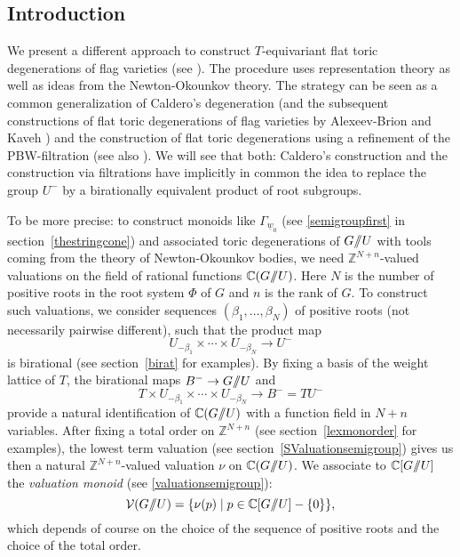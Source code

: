 \documentclass{emsprocart}
\theoremstyle{definition}
\begin{document}
\subsection{Introduction} We present a different approach to construct $T$-equi\-variant flat toric 
degenerations of flag varieties (see \cite{FaFL}). The procedure uses representation theory as well as ideas 
from the Newton-Okounkov theory. The strategy can be seen as a common generalization of Caldero's degeneration 
(and the subsequent constructions of flat toric degenerations of flag varieties by Alexeev-Brion \cite{AB}  
and Kaveh \cite{K1}) and the construction of flat toric degenerations using a refinement
of the PBW-filtration \cite{FFL1} (see also \cite{FFL2,FFL3}). We will see that both:
Caldero's construction and the construction via filtrations have implicitly in common the idea to replace the group 
$U^-$ by a birationally equivalent product of root subgroups.   

To be more precise: to construct monoids like $\Gamma_{\underline{w}_0}$ (see \eqref{semigroupfirst} in section~\ref{thestringcone})
and associated toric degenerations of $G/\hskip -3.5pt/U$ with tools coming from the theory of Newton-Okounkov bodies, we need 
$\mathbb Z^{N+n}$-valued valuations on the field of rational functions $\mathbb C(G/\hskip -3.5pt/U)$.
Here $N$ is the number of positive roots in the root system $\Phi$ of $G$ and $n$ is the rank of $G$.
To construct such valuations, we consider sequences $(\beta_1,\ldots,\beta_N)$ of positive roots
(not necessarily pairwise different), such that the product map 
$$
U_{-\beta_1}\times\cdots\times U_{-\beta_N}\rightarrow U^-
$$ 
is birational (see section~\ref{birat} for examples). By fixing a basis of the weight lattice of $T$,
the birational maps $B^-\rightarrow G/\hskip -3.5pt/U$ and 
$$
T\times U_{-\beta_1}\times\cdots\times U_{-\beta_N}\rightarrow B^-=TU^-
$$
provide a natural identification of $\mathbb C(G/\hskip -3.5pt/U)$ with a function field in $N+n$ variables.
After fixing a total order on $\mathbb Z^{N+n}$ (see section~\ref{lexmonorder} for examples), the lowest term valuation 
(see section~\ref{SValuationsemigroup}) gives 
us then a natural $\mathbb Z^{N+n}$-valued valuation $\nu$ on $\mathbb C(G/\hskip -3.5pt/U)$. 
We associate to $\mathbb C[G/\hskip -3.5pt/U]$ the {\it valuation monoid} (see \eqref{valuationsemigroup}):
$$
{\cal V}(G/\hskip -3.5pt/U)=\{\nu({p})\mid p\in \mathbb C[G/\hskip -3.5pt/U]-\{0\}\},
$$ 
which depends of course on the choice of the sequence of positive roots and the choice of the total order.
\end{document}
